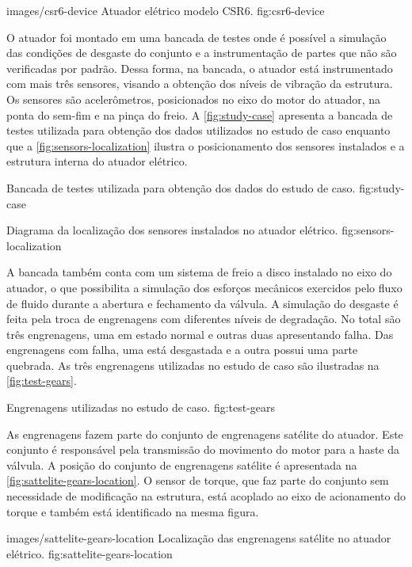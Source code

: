   {images/csr6-device}
  {Atuador elétrico modelo CSR6.}
  {fig:csr6-device}

O atuador foi montado em uma bancada de testes onde é possível a simulação das condições de desgaste
do conjunto e a instrumentação de partes que não são verificadas por padrão. Dessa forma, na
bancada, o atuador está instrumentado com mais três sensores, visando a obtenção dos níveis de
vibração da estrutura. Os sensores são acelerômetros, posicionados no eixo do motor do atuador, na
ponta do sem-fim e na pinça do freio. A \cref{fig:study-case} apresenta a bancada de testes
utilizada para obtenção dos dados utilizados no estudo de caso enquanto que a
\cref{fig:sensors-localization} ilustra o posicionamento dos sensores instalados e a estrutura
interna do atuador elétrico.


  {Bancada de testes utilizada para obtenção dos dados do estudo de caso.}
  {fig:study-case}

  {Diagrama da localização dos sensores instalados no atuador elétrico.}
  {fig:sensors-localization}

A bancada também conta com um sistema de freio a disco instalado no eixo do atuador, o que
possibilita a simulação dos esforços mecânicos exercidos pelo fluxo de fluido durante a abertura e
fechamento da válvula. A simulação do desgaste é feita pela troca de engrenagens com diferentes
níveis de degradação. No total são três engrenagens, uma em estado normal e outras duas apresentando
falha. Das engrenagens com falha, uma está desgastada e a outra possui uma parte quebrada. As três
engrenagens utilizadas no estudo de caso são ilustradas na \cref{fig:test-gears}.

  {Engrenagens utilizadas no estudo de caso.}
  {fig:test-gears}

As engrenagens fazem parte do conjunto de engrenagens satélite do atuador. Este conjunto é
responsável pela transmissão do movimento do motor para a haste da válvula. A posição do conjunto de
engrenagens satélite é apresentada na \cref{fig:sattelite-gears-location}. O sensor de torque, que
faz parte do conjunto sem necessidade de modificação na estrutura, está acoplado ao eixo de
acionamento do torque e também está identificado na mesma figura.

  {images/sattelite-gears-location}
  {Localização das engrenagens satélite no atuador elétrico.}
  {fig:sattelite-gears-location}



